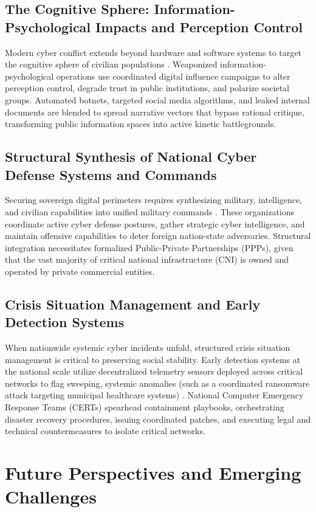 \documentclass[11pt,a4paper]{article}
\begin{document}
\subsection{The Cognitive Sphere: Information-Psychological Impacts and Perception Control}
Modern cyber conflict extends beyond hardware and software systems to target the cognitive sphere of civilian populations \cite{b7}. Weaponized information-psychological operations use coordinated digital influence campaigns to alter perception control, degrade trust in public institutions, and polarize societal groups. Automated botnets, targeted social media algorithms, and leaked internal documents are blended to spread narrative vectors that bypass rational critique, transforming public information spaces into active kinetic battlegrounds.

\subsection{Structural Synthesis of National Cyber Defense Systems and Commands}
Securing sovereign digital perimeters requires synthesizing military, intelligence, and civilian capabilities into unified military commands \cite{b7}. These organizations coordinate active cyber defense postures, gather strategic cyber intelligence, and maintain offensive capabilities to deter foreign nation-state adversaries. Structural integration necessitates formalized Public-Private Partnerships (PPPs), given that the vast majority of critical national infrastructure (CNI) is owned and operated by private commercial entities.

\subsection{Crisis Situation Management and Early Detection Systems}
When nationwide systemic cyber incidents unfold, structured crisis situation management is critical to preserving social stability. Early detection systems at the national scale utilize decentralized telemetry sensors deployed across critical networks to flag sweeping, systemic anomalies (such as a coordinated ransomware attack targeting municipal healthcare systems) \cite{b7}. National Computer Emergency Response Teams (CERTs) spearhead containment playbooks, orchestrating disaster recovery procedures, issuing coordinated patches, and executing legal and technical countermeasures to isolate critical networks.


\section{Future Perspectives and Emerging Challenges}
\end{document}
